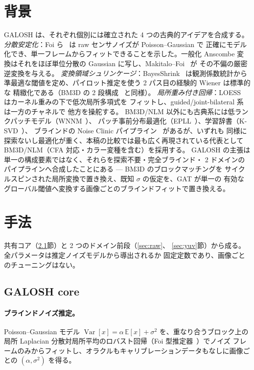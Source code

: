 \documentclass[10pt,twocolumn]{article}
\begin{document}
\section{背景}
GALOSH は、それぞれ個別には確立された 4 つの古典的アイデアを合成する。
\emph{分散安定化}：Foi ら~\cite{foi} は raw センサノイズが Poisson--Gaussian で
正確にモデル化でき、単一フレームからフィットできることを示した。一般化 Anscombe
変換はそれをほぼ単位分散の Gaussian に写し、Makitalo--Foi~\cite{makitalo} が
その不偏の厳密逆変換を与える。
\emph{変換領域シュリンケージ}：BayesShrink~\cite{bayesshrink} は観測係数統計から
準最適な閾値を定め、パイロット推定を使う 2 パス目の経験的 Wiener は標準的な
精緻化である（BM3D の 2 段構成~\cite{bm3d} と同様）。
\emph{局所重み付き回帰}：LOESS~\cite{loess} はカーネル重みの下で低次局所多項式を
フィットし、guided/joint-bilateral 系~\cite{kopf,guidedfilter} は一方のチャネルで
他方を操舵する。
BM3D/NLM 以外にも古典系には低ランクパッチモデル（WNNM~\cite{wnnm}）、
パッチ事前分布最適化（EPLL~\cite{epll}）、学習辞書（K-SVD~\cite{ksvd}）、
ブラインドの Noise Clinic パイプライン~\cite{noiseclinic} があるが、いずれも
同様に探索ないし最適化が重く、本稿の比較では最も広く再現されている代表として
BM3D/NLM（CFA 対応・カラー変種を含む）を採用する。
GALOSH の主張は単一の構成要素ではなく、それらを探索不要・完全ブラインド・
2 ドメインのパイプラインへ合成したことにある --- BM3D のブロックマッチングを
サイクルスピンされた局所変換で置き換え、既知 $\sigma$ の仮定を、GAT が単一の
有効なグローバル閾値へ変換する画像ごとのブラインドフィットで置き換える。

\section{手法}\label{sec:method}
共有コア（\ref{sec:core}節）と 2 つのドメイン前段（\ref{sec:raw}、
\ref{sec:yuv}節）から成る。全パラメータは推定ノイズモデルから導出されるか
固定定数であり、画像ごとのチューニングはない。

\subsection{GALOSH core}\label{sec:core}
\paragraph{ブラインドノイズ推定。}
Poisson--Gaussian モデル
$\operatorname{Var}[x]=\alpha\,\mathbb{E}[x]+\sigma^2$ を、重なり合うブロック上の
局所 Laplacian 分散対局所平均のロバスト回帰（Foi 型推定器~\cite{foi}）でノイズ
フレームのみからフィットし、オラクルもキャリブレーションデータもなしに画像ごとの
$(\alpha,\sigma^2)$ を得る。
\end{document}
